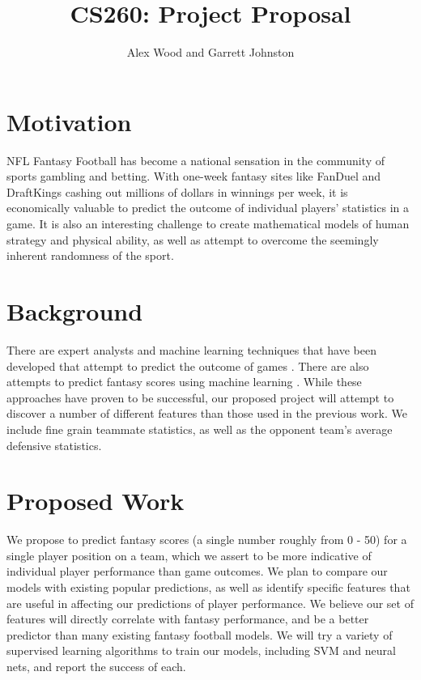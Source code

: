 \documentclass[11pt,a4paper]{article}
\author{Alex Wood and Garrett Johnston}
\title {CS260: Project Proposal}
\begin{document}
\maketitle

\section{Motivation}
NFL Fantasy Football has become a national sensation in the community of sports gambling and betting.  With one-week fantasy sites like FanDuel and DraftKings cashing out millions of dollars in winnings per week, it is economically valuable to predict the outcome of individual players’ statistics in a game. It is also an interesting challenge to create mathematical models of human strategy and physical ability, as well as attempt to overcome the seemingly inherent randomness of the sport.

\section{Background}	
There are expert analysts and machine learning techniques that have been developed that attempt to predict the outcome of games \cite{Cornell}. There are also attempts to predict fantasy scores using machine learning \cite{UMASS}. While these approaches have proven to be successful, our proposed project will attempt to discover a number of different features than those used in the previous work. We include fine grain teammate statistics, as well as the opponent team’s average defensive statistics.

\section{Proposed Work}
We propose to predict fantasy scores (a single number roughly from 0 - 50) for a single player position on a team, which we assert to be more indicative of individual player performance than game outcomes. We plan to compare our models with existing popular predictions, as well as identify specific features that are useful in affecting our predictions of player performance. We believe our set of features will directly correlate with fantasy performance, and be a better predictor than many existing fantasy football models. We will try a variety of supervised learning algorithms to train our models, including SVM and neural nets, and report the success of each.
\end{document}
